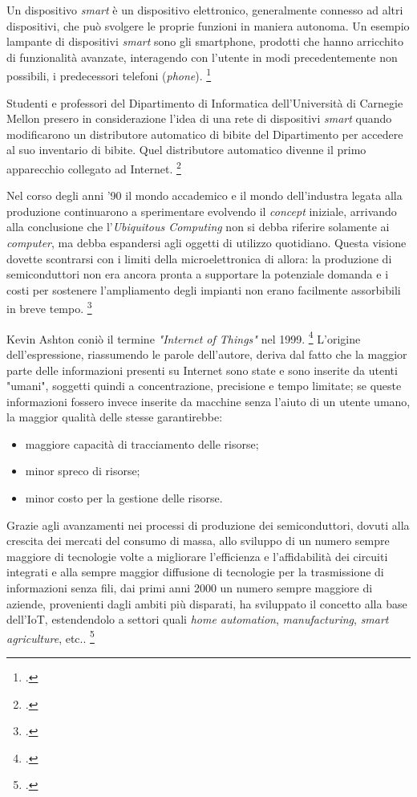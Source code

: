 Un dispositivo \emph{smart} è un dispositivo elettronico, generalmente connesso ad altri dispositivi, che può svolgere le proprie funzioni in maniera autonoma.
Un esempio lampante di dispositivi \emph{smart} sono gli smartphone, prodotti che hanno arricchito di funzionalità avanzate, interagendo con l'utente in modi precedentemente non possibili, i predecessori telefoni (\emph{phone}).
\footcite{site:smart-device}

Studenti e professori del Dipartimento di Informatica dell'Università di Carnegie Mellon presero in considerazione l'idea di una rete di dispositivi \emph{smart} quando modificarono un distributore automatico di bibite del Dipartimento per accedere al suo inventario di bibite. Quel distributore automatico divenne il primo apparecchio collegato ad Internet.
\footcite{site:mellon-uni}

Nel corso degli anni '90 il mondo accademico e il mondo dell'industra legata alla produzione continuarono a sperimentare evolvendo il \textit{concept} iniziale, arrivando alla conclusione che l'\textit{Ubiquitous Computing} non si debba riferire solamente ai \textit{computer}, ma debba espandersi agli oggetti di utilizzo quotidiano. Questa visione dovette scontrarsi con i limiti della microelettronica di allora: la produzione di semiconduttori non era ancora pronta a supportare la potenziale domanda e i costi per sostenere l'ampliamento degli impianti non erano facilmente assorbibili in breve tempo.
\footcite{site:mit-weiser}

Kevin Ashton coniò il termine \textit{"Internet of Things"} nel 1999.
\footcite{site:iot-kashton}
L'origine dell'espressione, riassumendo le parole dell'autore, deriva dal fatto che la maggior parte delle informazioni presenti su Internet sono state e sono inserite da utenti "umani", soggetti quindi a concentrazione, precisione e tempo limitate;
se queste informazioni fossero invece inserite da macchine senza l'aiuto di un utente umano, la maggior qualità delle stesse garantirebbe:
\begin{itemize}
  \item maggiore capacità di tracciamento delle risorse;
  \item minor spreco di risorse;
  \item minor costo per la gestione delle risorse.
\end{itemize}

Grazie agli avanzamenti nei processi di produzione dei semiconduttori, dovuti alla crescita dei mercati del consumo di massa, allo sviluppo di un numero sempre maggiore di tecnologie volte a migliorare l'efficienza e l'affidabilità dei circuiti integrati e alla sempre maggior diffusione di tecnologie per la trasmissione di informazioni senza fili, dai primi anni 2000 un numero sempre maggiore di aziende, provenienti dagli ambiti più disparati, ha sviluppato il concetto alla base dell'IoT, estendendolo a settori quali \textit{home automation}, \textit{manufacturing}, \textit{smart agriculture}, etc..
\footcite{site:pc-to-things}

